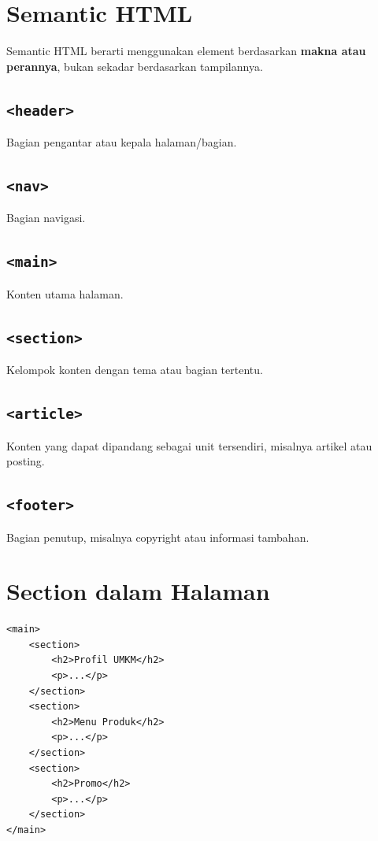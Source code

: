 \documentclass[11pt,a4paper]{article}
\begin{document}
\section{Semantic HTML}
Semantic HTML berarti menggunakan element berdasarkan \textbf{makna atau perannya}, bukan sekadar berdasarkan tampilannya.
\subsection{\texttt{<header>}}Bagian pengantar atau kepala halaman/bagian.
\subsection{\texttt{<nav>}}Bagian navigasi.
\subsection{\texttt{<main>}}Konten utama halaman.
\subsection{\texttt{<section>}}Kelompok konten dengan tema atau bagian tertentu.
\subsection{\texttt{<article>}}Konten yang dapat dipandang sebagai unit tersendiri, misalnya artikel atau posting.
\subsection{\texttt{<footer>}}Bagian penutup, misalnya copyright atau informasi tambahan.

\section{Section dalam Halaman}
\begin{lstlisting}[style=htmlstyle]
<main>
    <section>
        <h2>Profil UMKM</h2>
        <p>...</p>
    </section>
    <section>
        <h2>Menu Produk</h2>
        <p>...</p>
    </section>
    <section>
        <h2>Promo</h2>
        <p>...</p>
    </section>
</main>
\end{lstlisting}
\end{document}
